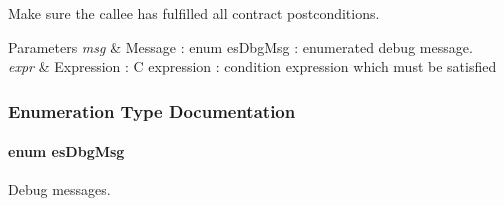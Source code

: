Make sure the callee has fulfilled all contract postconditions. 


\begin{DoxyParams}{Parameters}
{\em msg} & Message \-: enum es\-Dbg\-Msg \-: enumerated debug message. \\
\hline
{\em expr} & Expression \-: C expression \-: condition expression which must be satisfied \\
\hline
\end{DoxyParams}


\subsubsection{Enumeration Type Documentation}
\hypertarget{group__dbg__intf_ga571a5933b00f4fdc98d1885a6b0f4613}{
\paragraph[{es\-Dbg\-Msg}]{\setlength{\rightskip}{0pt plus 5cm}enum {\bf es\-Dbg\-Msg}}}\label{group__dbg__intf_ga571a5933b00f4fdc98d1885a6b0f4613}


Debug messages. 

